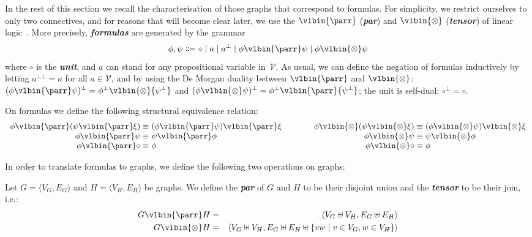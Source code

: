 \documentclass{lmcs} %
\def\lun{\mathord{\circ}}
\def\defn#1{\emph{\bfseries\boldmath #1}}
\newcommand{\fequiv}{\equiv}
\def\set#1{\{#1\}}
\def\tuple#1{\langle#1\rangle}
\def\cneg#1{{#1^\bot}}
\def\cnegg#1{{#1^{\bot\bot}}}
\def\lpar{\vlbin{\parr}}
\def\ltens{\vlbin{\otimes}}
\def\gG{G}
\def\gH{H}
\newcommand{\vertices}[1][]{V_{#1}}
\newcommand{\gEdges}[1][]{E_{#1}}
\newcommand{\vG}{\vertices[G]}
\newcommand{\eG}{\gEdges[G]}
\newcommand{\vH}{\vertices[H]}
\newcommand{\eH}{\gEdges[H]}
\newcommand{\cV}{\mathcal{V}}
\theoremstyle{plain}
\begin{document}
In the rest of this section we recall the characterisation of those
graphs that correspond to formulas. For simplicity, we restrict
ourselves to only two connectives, and for reasons that will become
clear later, we use the $\lpar$ (\defn{par}) and $\ltens$
(\defn{tensor}) of linear logic~\cite{girard:87}. More precisely,
\defn{formulas} are generated by the grammar
\begin{equation}
  \label{eq:gram}
  \phi,\psi\Coloneqq \lun\mid a\mid\cneg a\mid \phi\lpar\psi\mid \phi\ltens\psi
\end{equation}
where $\lun$ is the \defn{unit}, and $a$ can stand for any
propositional variable in~$\cV$. As usual, we can define the negation
of formulas inductively by letting
$\cnegg a=a$ for all $a\in\cV$, and by
using the De Morgan duality between $\lpar$
and $\ltens$: $\cneg{(\phi\lpar\psi)}=\cneg\phi\ltens\cneg\psi$ and
$\cneg{(\phi\ltens\psi)}=\cneg\phi\lpar\cneg\psi$; the unit is
self-dual: $\cneg \lun=\lun$.

On formulas we
define the following structural equivalence relation:
\begin{equation}
  \label{eq:fequiv}
    \begin{array}{r@{~}l@{\hskip4em}r@{~}l}
	\phi\lpar(\psi\lpar\xi)\fequiv&(\phi\lpar\psi)\lpar\xi 	&
	\phi\ltens(\psi\ltens\xi)\fequiv&(\phi\ltens\psi)\ltens\xi \\
    	\phi\lpar\psi\fequiv&\psi\lpar\phi				&
    	\phi\ltens\psi\fequiv&\psi\ltens\phi 			\\
    	\phi\lpar\lun\fequiv&\phi 					&
    	\phi\ltens\lun\fequiv&\phi 					
    \end{array}
\end{equation}

In order to translate formulas to graphs, we define the following two
operations on graphs:

\begin{defi}\label{def:par}
  Let $\gG=\tuple{\vG,\eG}$ and $\gH=\tuple{\vH,\eH}$ be graphs. We define the \defn{par} of $\gG$ and $\gH$ to be their disjoint union and the \defn{tensor} to be their join, i.e.:
  \begin{eqnarray*}
    \gG\lpar\gH&=&\tuple{\vG\uplus\vH,\eG\uplus\eH}\\
    \gG\ltens\gH&=&\tuple{\vG\uplus\vH,\eG\uplus\eH\uplus\set{vw\mid v\in\vG,w\in\vH}}
  \end{eqnarray*}
\end{defi}
\end{document}
